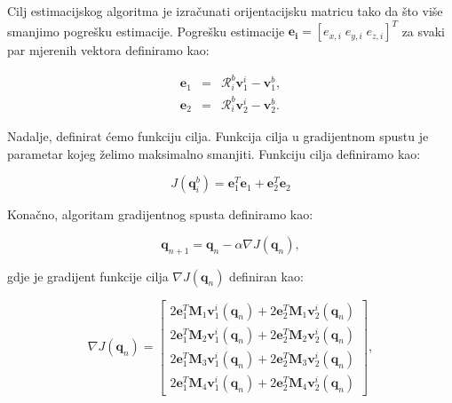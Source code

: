 \documentclass[times, utf8, diplomski, numeric]{templates/template}
\begin{document}
{{{{                Cilj estimacijskog algoritma je izračunati orijentacijsku matricu tako da što više smanjimo pogrešku estimacije. Pogrešku estimacije $\boldsymbol{e_i} = \left[e_{x,i} \; e_{y,i} \; e_{z,i}\right]^T$ za svaki par mjerenih vektora definiramo kao:

                \begin{equation}
                \begin{array}{rcl}
                    \boldsymbol{e}_1 & = & \mathcal{R}_i^b \boldsymbol{v}_1^i - \boldsymbol{v}_1^b, \\
                    \boldsymbol{e}_2 & = & \mathcal{R}_i^b \boldsymbol{v}_2^i - \boldsymbol{v}_2^b. 
                \end{array}
                \end{equation} 

                Nadalje, definirat ćemo funkciju cilja. Funkcija cilja u gradijentnom spustu je parametar kojeg želimo maksimalno smanjiti. Funkciju cilja definiramo kao:

                \begin{equation}
                    J(\boldsymbol{q}_i^b) = \boldsymbol{e}_1^T \boldsymbol{e}_1 + \boldsymbol{e}_2^T \boldsymbol{e}_2
                \end{equation}

                Konačno, algoritam gradijentnog spusta definiramo kao:

                \begin{equation}
                \label{eq:grad_des}
                    \boldsymbol{q}_{n+1} = \boldsymbol{q}_n - \alpha\nabla J(\boldsymbol{q}_n),
                \end{equation}

                gdje je gradijent funkcije cilja $\nabla J(\boldsymbol{q}_n)$ definiran kao:

                \begin{equation}
                    \nabla J(\boldsymbol{q}_n) = 
                    \begin{bmatrix}
                        2 \boldsymbol{e}_1^T \boldsymbol{M}_1 \boldsymbol{v}_1^i(\boldsymbol{q}_n) + 2 \boldsymbol{e}_2^T \boldsymbol{M}_1 \boldsymbol{v}_2^i(\boldsymbol{q}_n) \\
                        2 \boldsymbol{e}_1^T \boldsymbol{M}_2 \boldsymbol{v}_1^i(\boldsymbol{q}_n) + 2 \boldsymbol{e}_2^T \boldsymbol{M}_2 \boldsymbol{v}_2^i(\boldsymbol{q}_n) \\
                        2 \boldsymbol{e}_1^T \boldsymbol{M}_3 \boldsymbol{v}_1^i(\boldsymbol{q}_n) + 2 \boldsymbol{e}_2^T \boldsymbol{M}_3 \boldsymbol{v}_2^i(\boldsymbol{q}_n) \\
                        2 \boldsymbol{e}_1^T \boldsymbol{M}_4 \boldsymbol{v}_1^i(\boldsymbol{q}_n) + 2 \boldsymbol{e}_2^T \boldsymbol{M}_4 \boldsymbol{v}_2^i(\boldsymbol{q}_n)
                    \end{bmatrix}
                    ,
                \end{equation}

}}}}
\end{document}
